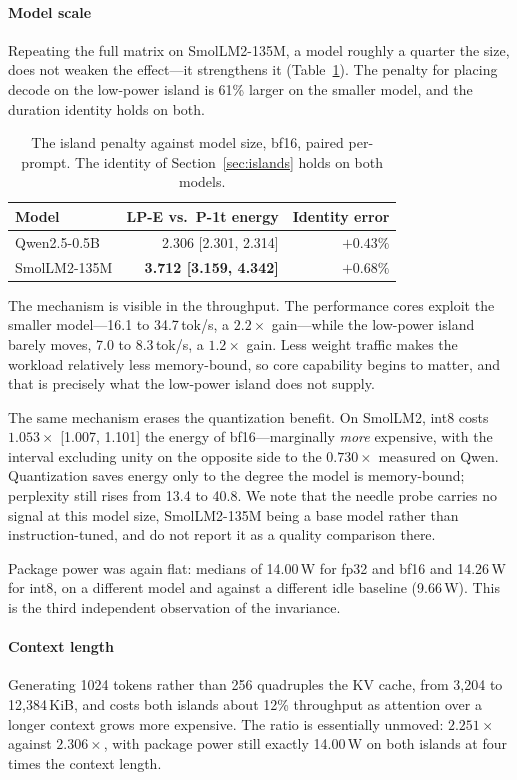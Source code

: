 \documentclass[journal]{IEEEtran}
\begin{document}
\paragraph{Model scale} Repeating the full matrix on SmolLM2-135M, a model
roughly a quarter the size, does not weaken the effect---it strengthens it
(Table~\ref{tab:scale}). The penalty for placing decode on the low-power island
is 61\% larger on the smaller model, and the duration identity holds on both.

\begin{table}[t]
\centering
\caption{The island penalty against model size, bf16, paired per-prompt.
The identity of Section~\ref{sec:islands} holds on both models.}
\label{tab:scale}
\begin{tabular}{lrr}
\toprule
Model & LP-E vs.\ P-1t energy & Identity error \\
\midrule
Qwen2.5-0.5B & 2.306 [2.301, 2.314] & $+0.43\%$ \\
SmolLM2-135M & \textbf{3.712 [3.159, 4.342]} & $+0.68\%$ \\
\bottomrule
\end{tabular}
\end{table}

The mechanism is visible in the throughput. The performance cores exploit the
smaller model---16.1 to 34.7\,tok/s, a $2.2\times$ gain---while the low-power
island barely moves, 7.0 to 8.3\,tok/s, a $1.2\times$ gain. Less weight traffic
makes the workload relatively less memory-bound, so core capability begins to
matter, and that is precisely what the low-power island does not supply.

The same mechanism erases the quantization benefit. On SmolLM2, int8 costs
$1.053\times$ [1.007, 1.101] the energy of bf16---marginally \emph{more}
expensive, with the interval excluding unity on the opposite side to the
$0.730\times$ measured on Qwen. Quantization saves energy only to the degree the
model is memory-bound; perplexity still rises from 13.4 to 40.8. We note that
the needle probe carries no signal at this model size, SmolLM2-135M being a base
model rather than instruction-tuned, and do not report it as a quality
comparison there.

Package power was again flat: medians of 14.00\,W for fp32 and bf16 and
14.26\,W for int8, on a different model and against a different idle baseline
(9.66\,W). This is the third independent observation of the invariance.

\paragraph{Context length} Generating 1024 tokens rather than 256 quadruples the
KV cache, from 3{,}204 to 12{,}384\,KiB, and costs both islands about 12\%
throughput as attention over a longer context grows more expensive. The ratio is
essentially unmoved: $2.251\times$ against $2.306\times$, with package power
still exactly 14.00\,W on both islands at four times the context length.
\end{document}
